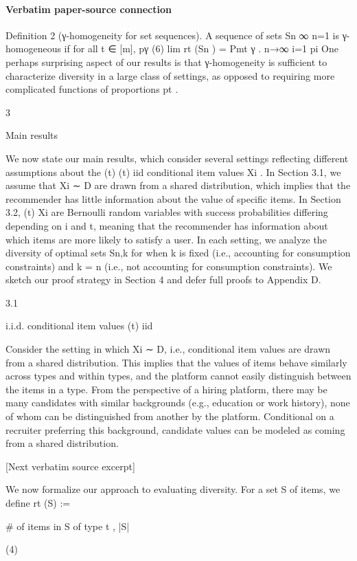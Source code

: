 \documentclass[10pt]{article}
\begin{document}
\paragraph{Verbatim paper-source connection}
\begin{ReviewVerbatim}
Definition 2 (γ-homogeneity for set sequences). A sequence of sets {Sn }∞
n=1 is γ-homogeneous if for all
t ∈ [m],
pγ
(6)
lim rt (Sn ) = Pmt γ .
n→∞
i=1 pi
One perhaps surprising aspect of our results is that γ-homogeneity is sufficient to characterize diversity
in a large class of settings, as opposed to requiring more complicated functions of proportions pt .

3

Main results

We now state our main results, which consider several settings reflecting different assumptions about the
(t)
(t) iid
conditional item values Xi . In Section 3.1, we assume that Xi ∼ D are drawn from a shared distribution,
which implies that the recommender has little information about the value of specific items. In Section 3.2,
(t)
Xi are Bernoulli random variables with success probabilities differing depending on i and t, meaning that
the recommender has information about which items are more likely to satisfy a user.
In each setting, we analyze the diversity of optimal sets Sn,k for when k is fixed (i.e., accounting for
consumption constraints) and k = n (i.e., not accounting for consumption constraints). We sketch our proof
strategy in Section 4 and defer full proofs to Appendix D.

3.1

i.i.d. conditional item values
(t) iid

Consider the setting in which Xi ∼ D, i.e., conditional item values are drawn from a shared distribution.
This implies that the values of items behave similarly across types and within types, and the platform cannot
easily distinguish between the items in a type. From the perspective of a hiring platform, there may be many
candidates with similar backgrounds (e.g., education or work history), none of whom can be distinguished
from another by the platform. Conditional on a recruiter preferring this background, candidate values can
be modeled as coming from a shared distribution.

[Next verbatim source excerpt]

We now formalize our approach to evaluating diversity. For a set S of items, we define
rt (S) :=

# of items in S of type t
,
|S|

(4)
\end{ReviewVerbatim}
\end{document}
